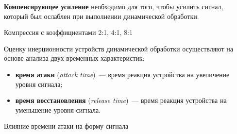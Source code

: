 \documentclass{beamer}
\begin{document}
\begin{frame}
  \textbf{Компенсирующее усиление} необходимо для того, чтобы усилить сигнал, который был ослаблен при выполнении динамической обработки.

  \begin{block}{Компрессия с коэффициентами 2:1, 4:1, 8:1}
  \end{block}
\end{frame}

\begin{frame}
  Оценку инерционности устройств динамической обработки осуществляют на основе анализа двух временных характеристик:
  \begin{itemize}
    \item \textbf{время атаки} (\emph{attack time})~--- время реакция устройства на увеличение уровня сигнала;
    \item \textbf{время восстановления }(\emph{release time})~--- время реакция устройства на уменьшение уровня сигнала.
  \end{itemize}

  \begin{block}{Влияние времени атаки на форму сигнала}
  \end{block}
\end{frame}
\end{document}

